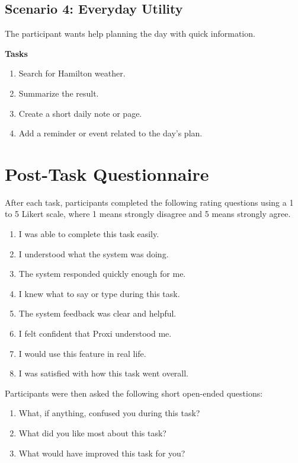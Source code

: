 \documentclass[12pt, titlepage]{article}
\begin{document}
\subsection{Scenario 4: Everyday Utility}

The participant wants help planning the day with quick information.

\textbf{Tasks}
\begin{enumerate}[label=\arabic*.]
    \item Search for Hamilton weather.
    \item Summarize the result.
    \item Create a short daily note or page.
    \item Add a reminder or event related to the day's plan.
\end{enumerate}

\section{Post-Task Questionnaire}

After each task, participants completed the following rating questions
using a 1 to 5 Likert scale, where 1 means strongly disagree and 5 means
strongly agree.

\begin{enumerate}[label=\arabic*.]
    \item I was able to complete this task easily.
    \item I understood what the system was doing.
    \item The system responded quickly enough for me.
    \item I knew what to say or type during this task.
    \item The system feedback was clear and helpful.
    \item I felt confident that Proxi understood me.
    \item I would use this feature in real life.
    \item I was satisfied with how this task went overall.
\end{enumerate}

Participants were then asked the following short open-ended questions:
\begin{enumerate}[label=\arabic*.]
    \item What, if anything, confused you during this task?
    \item What did you like most about this task?
    \item What would have improved this task for you?
\end{enumerate}
\end{document}
